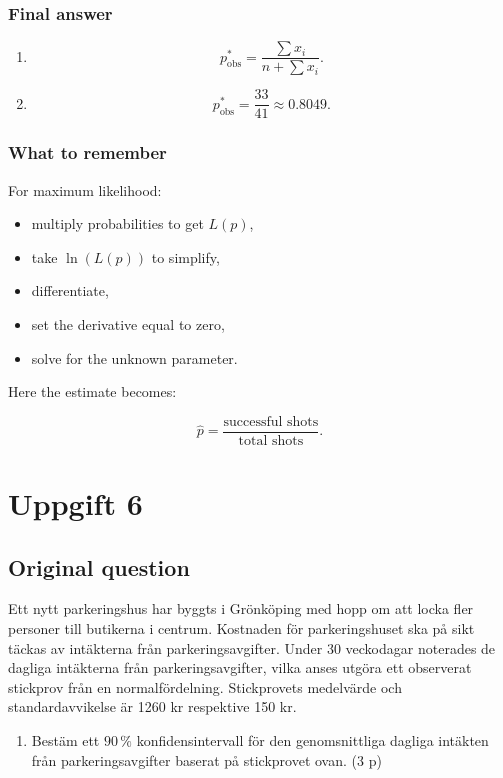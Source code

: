 \documentclass[10pt]{article}
\begin{document}
\subsubsection*{Final answer}
\begin{enumerate}[label=\alph*)]
\item
\[
p^*_{\mathrm{obs}}
=
\frac{\sum x_i}
{n+\sum x_i}.
\]

\item
\[
p^*_{\mathrm{obs}}
=
\frac{33}{41}
\approx 0.8049.
\]
\end{enumerate}

\subsubsection*{What to remember}
For maximum likelihood:

\begin{itemize}
\item multiply probabilities to get $L(p)$,
\item take $\ln(L(p))$ to simplify,
\item differentiate,
\item set the derivative equal to zero,
\item solve for the unknown parameter.
\end{itemize}

Here the estimate becomes:

\[
\hat p
=
\frac{\text{successful shots}}
{\text{total shots}}.
\]

\section*{Uppgift 6}

\subsection*{Original question}
Ett nytt parkeringshus har byggts i Grönköping med hopp om att locka
fler personer till butikerna i centrum. Kostnaden för parkeringshuset
ska på sikt täckas av intäkterna från parkeringsavgifter. Under
30 veckodagar noterades de dagliga intäkterna från parkeringsavgifter,
vilka anses utgöra ett observerat stickprov från en normalfördelning.
Stickprovets medelvärde och standardavvikelse är 1260 kr respektive
150 kr.

\begin{enumerate}[label=\alph*)]
\item
Bestäm ett $90\,\%$ konfidensintervall för den genomsnittliga dagliga
intäkten från parkeringsavgifter baserat på stickprovet ovan.
\hfill (3 p)
\end{enumerate}
\end{document}

